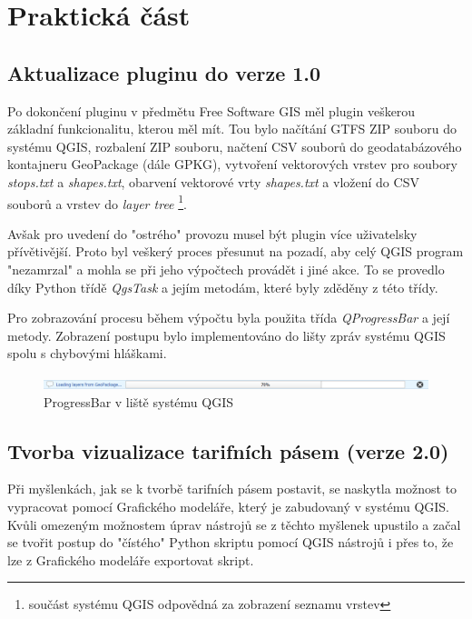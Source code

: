 \chapter{Praktická část}
\label{5-postup}

\section{Aktualizace pluginu do verze 1.0}
Po dokončení pluginu v předmětu Free Software GIS měl plugin veškerou základní 
funkcionalitu, kterou měl mít. Tou bylo načítání GTFS ZIP souboru do systému QGIS,
rozbalení ZIP souboru, načtení CSV souborů do geodatabázového kontajneru GeoPackage (dále GPKG),
vytvoření vektorových vrstev pro soubory \textit{stops.txt} a \textit{shapes.txt},
obarvení vektorové vrty \textit{shapes.txt} a vložení do CSV souborů a vrstev do
\textit{layer tree} \footnote{součást systému QGIS odpovědná za zobrazení seznamu vrstev}.

Avšak pro uvedení do "ostrého" provozu musel být plugin více uživatelsky přívětivější.
Proto byl veškerý proces přesunut na pozadí, aby celý QGIS program "nezamrzal" a
mohla se při jeho výpočtech provádět i jiné akce. To se provedlo díky Python třídě \textit{QgsTask}
a jejím metodám, které byly zděděny z této třídy. \cite{QgsTask}

Pro zobrazování procesu během výpočtu byla použita třída \textit{QProgressBar} a její metody.
Zobrazení postupu bylo implementováno do lišty zpráv systému QGIS spolu s chybovými hláškami.

\begin{figure}[H] \centering
    \includegraphics[width=400pt]{./pictures/loading.png}
    \caption[ProgressBar]{ProgressBar v liště systému QGIS}
	\label{fig:ProgressBar v liště systému QGIS}              
\end{figure}     


\section{Tvorba vizualizace tarifních pásem (verze 2.0)}

Při myšlenkách, jak se k tvorbě tarifních pásem postavit,
se naskytla možnost to vypracovat pomocí Grafického modeláře, který je zabudovaný v systému QGIS. 
Kvůli omezeným možnostem úprav nástrojů se z těchto myšlenek upustilo a začal se tvořit postup
do "čístého" Python skriptu pomocí QGIS nástrojů i přes to, že lze z Grafického modeláře exportovat skript. 

